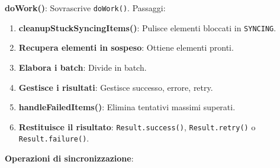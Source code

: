 \textbf{doWork()}: Sovrascrive \texttt{doWork()}.
Passaggi:
\begin{enumerate}
    \item \textbf{cleanupStuckSyncingItems()}: Pulisce elementi bloccati in
    \texttt{SYNCING}.
    \item \textbf{Recupera elementi in sospeso}: Ottiene elementi pronti.
    \item \textbf{Elabora i batch}: Divide in batch.
    \item \textbf{Gestisce i risultati}: Gestisce successo, errore, retry.
    \item \textbf{handleFailedItems()}: Elimina tentativi massimi superati.
    \item \textbf{Restituisce il risultato}: \texttt{Result.success()},
    \texttt{Result.retry()} o \texttt{Result.failure()}.
\end{enumerate}

\textbf{Operazioni di sincronizzazione}:


